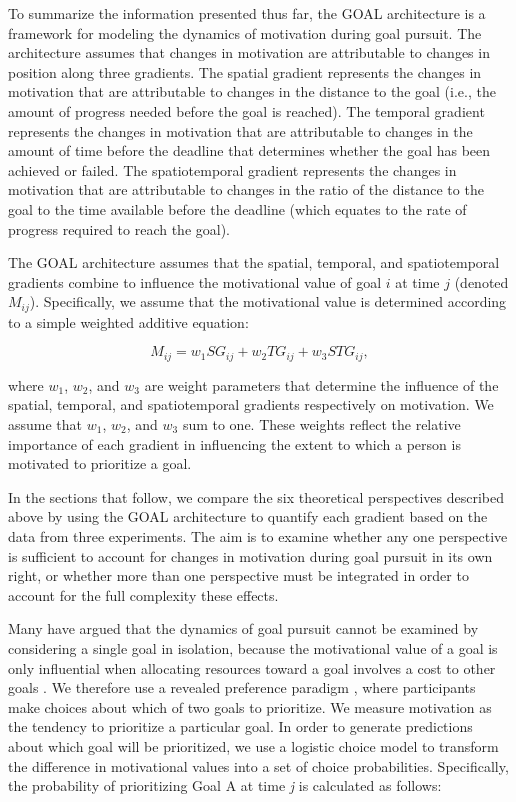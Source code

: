 \documentclass[a4paper,doc,natbib,donotrepeattitle]{apa6}
\begin{document}
To summarize the information presented thus far, the GOAL architecture is a framework for modeling the dynamics of motivation during goal pursuit. The architecture assumes that changes in motivation are attributable to changes in position along three gradients. The spatial gradient represents the changes in motivation that are attributable to changes in the distance to the goal (i.e., the amount of progress needed before the goal is reached). The temporal gradient represents the changes in motivation that are attributable to changes in the amount of time before the deadline that determines whether the goal has been achieved or failed. The spatiotemporal gradient represents the changes in motivation that are attributable to changes in the ratio of the distance to the goal to the time available before the deadline (which equates to the rate of progress required to reach the goal).

The GOAL architecture assumes that the spatial, temporal, and spatiotemporal gradients combine to influence the motivational value of goal $i$ at time $j$ (denoted $M_{ij}$). Specifically, we assume that the motivational value is determined according to a simple weighted additive equation:

\begin{equation}
M_{ij} = w_{1}SG_{ij} + w_{2}TG_{ij} + w_{3}STG_{ij},
\end{equation}

\noindent where $w_1$, $w_2$, and $w_3$ are weight parameters that determine the influence of the spatial, temporal, and spatiotemporal gradients respectively on motivation. We assume that $w_{1}$, $w_{2}$, and $w_{3}$ sum to one. These weights reflect the relative importance of each gradient in influencing the extent to which a person is motivated to prioritize a goal.

 In the sections that follow, we compare the six theoretical perspectives described above by using the GOAL architecture to quantify each gradient based on the data from three experiments. The aim is to examine whether any one perspective is sufficient to account for changes in motivation during goal pursuit in its own right, or whether more than one perspective must be integrated in order to account for the full complexity these effects.

Many have argued that the dynamics of goal pursuit cannot be examined by considering a single goal in isolation, because the motivational value of a goal is only influential when allocating resources toward a goal involves a cost to other goals \citep[e.g.,][]{Austin1996}. We therefore use a revealed preference paradigm \citep[e.g.,][]{Kool2014,Kool2010}, where participants make choices about which of two goals to prioritize. We measure motivation as the tendency to prioritize a particular goal. In order to generate predictions about which goal will be prioritized, we use a logistic choice model to transform the difference in motivational values into a set of choice probabilities. Specifically, the probability of prioritizing Goal A at time \textit{j} is calculated as follows:
\end{document}
